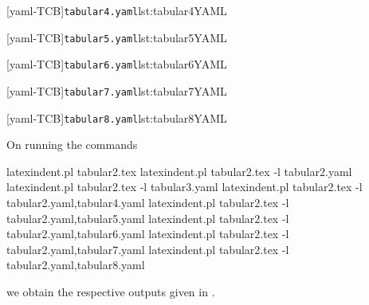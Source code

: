 	\begin{minipage}{.45\textwidth}
		[yaml-TCB]{\texttt{tabular4.yaml}}{lst:tabular4YAML}
	\end{minipage}%
	\hfill
	\begin{minipage}{.48\textwidth}
		[yaml-TCB]{\texttt{tabular5.yaml}}{lst:tabular5YAML}
	\end{minipage}%

	\begin{minipage}{.45\textwidth}
		[yaml-TCB]{\texttt{tabular6.yaml}}{lst:tabular6YAML}
	\end{minipage}%
	\hfill
	\begin{minipage}{.48\textwidth}
		[yaml-TCB]{\texttt{tabular7.yaml}}{lst:tabular7YAML}
	\end{minipage}%

	\begin{minipage}{.48\textwidth}
		[yaml-TCB]{\texttt{tabular8.yaml}}{lst:tabular8YAML}
	\end{minipage}%

	On running the commands  
	\begin{commandshell}
latexindent.pl tabular2.tex 
latexindent.pl tabular2.tex -l tabular2.yaml
latexindent.pl tabular2.tex -l tabular3.yaml
latexindent.pl tabular2.tex -l tabular2.yaml,tabular4.yaml
latexindent.pl tabular2.tex -l tabular2.yaml,tabular5.yaml
latexindent.pl tabular2.tex -l tabular2.yaml,tabular6.yaml
latexindent.pl tabular2.tex -l tabular2.yaml,tabular7.yaml
latexindent.pl tabular2.tex -l tabular2.yaml,tabular8.yaml
\end{commandshell}
	we obtain the respective outputs given in
	.

